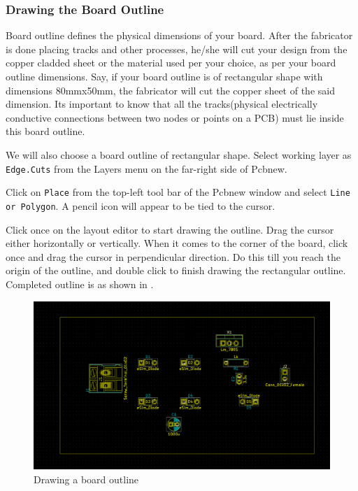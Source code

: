 \subsubsection{Drawing the Board Outline}
\begin{compactenum}
\item Board outline defines the physical dimensions of your board. After the fabricator is done placing tracks and other processes, he/she will cut your design from the copper cladded sheet or the material used per your choice, as per your board outline dimensions. Say, if your board outline is of rectangular shape with dimensions 80mmx50mm, the fabricator will cut the copper sheet of the said dimension. Its important to know that all the tracks(physical electrically conductive connections between two nodes or points on a PCB) must lie inside this board outline.
\item We will also choose a board outline of rectangular shape. Select working layer as \texttt{Edge.Cuts} from the Layers menu on the far-right side of Pcbnew.
\item Click on \texttt{Place} from the top-left tool bar of the Pcbnew window and select \texttt{Line or Polygon}. A pencil icon will appear to be tied to the cursor.
\item Click once on the layout editor to start drawing the outline. Drag the cursor either horizontally or vertically. When it comes to the corner of the board, click once and drag the cursor in perpendicular direction. Do this till you reach the origin of the outline, and double click to finish drawing the rectangular outline. Completed outline is as shown in .
\end{compactenum}

\begin{figure}
\centering
\includegraphics[height=0.4\textwidth]{boardoutline.png}
\caption{Drawing a board outline}
\label{brdoutline}
\end{figure}

